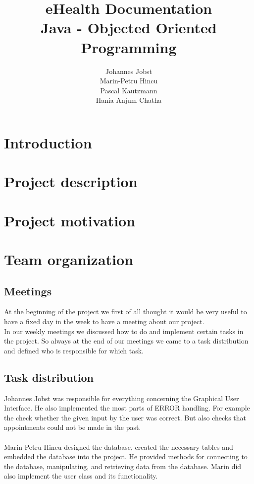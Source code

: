 \documentclass[a4paper, 12pt]{report}
\title{\textbf{eHealth Documentation}\\Java - Objected Oriented Programming}
\author{Johannes Jobst\\Marin-Petru Hincu\\Pascal Kautzmann\\Hania Anjum Chatha}
\begin{document}
\maketitle


\tableofcontents
\listoffigures

\chapter{Introduction}

\chapter{Project description}

\chapter{Project motivation}

\chapter{Team organization}
\section{Meetings}
At the beginning of the project we first of all thought it would be very useful 
to have a fixed day in the week to have a meeting about our project. \\
In our weekly meetings we discussed how to do and implement certain tasks in the project.
So always at the end of our meetings we came to a task distribution and defined who is
responsible for which task. 
\section{Task distribution}
Johannes Jobst was responsible for everything concerning the Graphical User Interface.
He also implemented the most parts of ERROR handling. For example the check whether the given
input by the user was correct. But also checks that appointments could not be made in the past. \\ \\
Marin-Petru Hincu designed the database, created the necessary tables and embedded the database into the project. He provided methods for connecting to the database, manipulating, and retrieving data from the database. Marin did also implement the user class and its functionality. \\ \\
\end{document}
